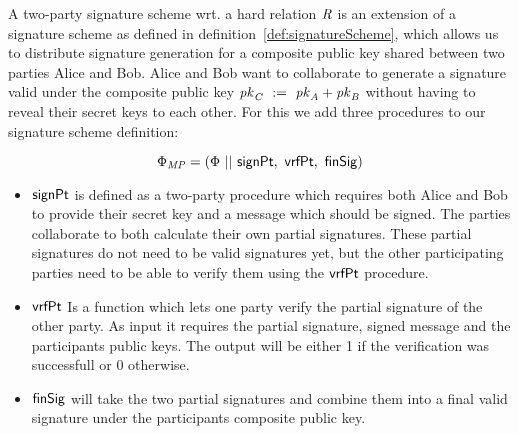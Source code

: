 \begin{definition}
    \label{def:twoPartySig}
    A two-party signature scheme wrt. a hard relation $\mathit{R}$ is an extension of a signature scheme as defined in definition~\ref{def:signatureScheme}, which allows us to distribute signature generation for a composite public key shared between two parties Alice and Bob.
    Alice and Bob want to collaborate to generate a signature valid under the composite public key $\mathit{pk}_{\mathit{C}} ~:=~ \mathit{pk}_{\mathit{A}} + \mathit{pk}_{\mathit{B}}$ without having to reveal their secret keys to each other. For this we add three procedures to our signature scheme definition:

    \[ \Phi_{\mathit{MP}} = (\Phi ~||~ \mathsf{signPt} ,~ \mathsf{vrfPt} ,~ \mathsf{finSig}) \]
    \begin{itemize}
        \item $\mathsf{signPt}$ is defined as a two-party procedure which requires both Alice and Bob to provide their secret key and a message which should be signed. The parties collaborate to both calculate their own partial signatures. These partial signatures do not need to be valid signatures yet, but the other participating parties need to be able to verify them using the $\mathsf{vrfPt}$ procedure.
        \item $\mathsf{vrfPt}$ Is a function which lets one party verify the partial signature of the other party. As input it requires the partial signature, signed message and the participants public keys. The output will be either 1 if the verification was successfull or 0 otherwise.
        \item $\mathsf{finSig}$ will take the two partial signatures and combine them into a final valid signature under the participants composite public key.
    \end{itemize}
\end{definition}


